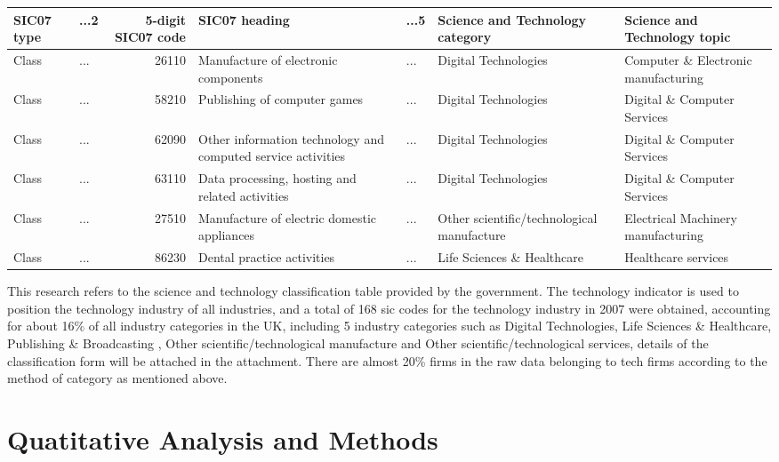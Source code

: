 \documentclass[
  12pt,
  oneside]{book}
\begin{document}
\begin{table}
\centering
\begin{tabular}{llrllll}
\toprule
\textbf{SIC07 type} & \textbf{...2} & \textbf{5-digit SIC07 code} & \textbf{SIC07 heading} & \textbf{...5} & \textbf{Science and Technology category} & \textbf{Science and Technology topic}\\
\midrule
Class & ... & 26110 & Manufacture of electronic components & ... & Digital Technologies & Computer \& Electronic manufacturing\\
Class & ... & 58210 & Publishing of computer games & ... & Digital Technologies & Digital \& Computer Services\\
Class & ... & 62090 & Other information technology and computed service activities & ... & Digital Technologies & Digital \& Computer Services\\
Class & ... & 63110 & Data processing, hosting and related activities & ... & Digital Technologies & Digital \& Computer Services\\
Class & ... & 27510 & Manufacture of electric domestic appliances & ... & Other scientific/technological manufacture & Electrical Machinery manufacturing\\
\addlinespace
Class & ... & 86230 & Dental practice activities & ... & Life Sciences \& Healthcare & Healthcare services\\
\bottomrule
\end{tabular}
\end{table}

This research refers to the science and technology classification table provided by the government. The technology indicator is used to position the technology industry of all industries, and a total of 168 sic codes for the technology industry in 2007 were obtained, accounting for about 16\% of all industry categories in the UK, including 5 industry categories such as Digital Technologies, Life Sciences \& Healthcare, Publishing \& Broadcasting , Other scientific/technological manufacture and Other scientific/technological services, details of the classification form will be attached in the attachment. There are almost 20\% firms in the raw data belonging to tech firms according to the method of category as mentioned above.

\hypertarget{quatitative-analysis-and-methods}{%
\section{Quatitative Analysis and Methods}\label{quatitative-analysis-and-methods}}
\end{document}

